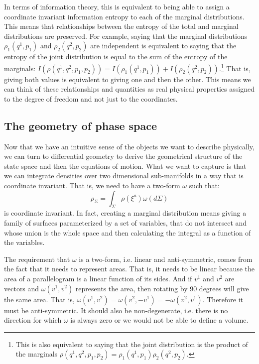 \documentclass[11pt]{article}
\begin{document}
In terms of information theory, this is equivalent to being able to assign a coordinate invariant information entropy to each of the marginal distributions. This means that relationships between the entropy of the total and marginal distributions are preserved. For example, saying that the marginal distributions $\rho_1(q^1, p_1)$ and $\rho_2(q^2, p_2)$ are independent is equivalent to saying that the entropy of the joint distribution is equal to the sum of the entropy of the marginals: $I(\rho(q^1,q^2, p_1, p_2)) = I(\rho_1(q^1, p_1)) +I(\rho_2(q^2, p_2))$.\footnote{This is also equivalent to saying that the joint distribution is the product of the marginals $\rho(q^1,q^2, p_1, p_2) = \rho_1(q^1, p_1)\rho_2(q^2, p_2)$.} That is, giving both values is equivalent to giving one and then the other. This means we can think of these relationships and quantities as real physical properties assigned to the degree of freedom and not just to the coordinates.

\subsection*{The geometry of phase space}

Now that we have an intuitive sense of the objects we want to describe physically, we can turn to differential geometry to derive the geometrical structure of the state space and then the equations of motion. What we want to capture is that we can integrate densities over two dimensional sub-manifolds in a way that is coordinate invariant. That is, we need to have a two-form $\omega$ such that:
\begin{equation}
\rho_\Sigma = \int_\Sigma \rho(\xi^a) \omega(d\Sigma)
\end{equation}
is coordinate invariant. In fact, creating a marginal distribution means giving a family of surfaces parameterized by a set of variables, that do not intersect and whose union is the whole space and then calculating the integral as a function of the variables.

The requirement that $\omega$ is a two-form, i.e. linear and anti-symmetric, comes from the fact that it needs to represent areas. That is, it needs to be linear because the area of a parallelogram is a linear function of its sides. And if $v^1$ and $v^2$ are vectors and $\omega(v^1, v^2)$ represents the area, then rotating by 90 degrees will give the same area. That is, $\omega(v^1, v^2) = \omega(v^2, -v^1) = -\omega(v^2, v^1)$. Therefore it must be anti-symmetric. It should also be non-degenerate, i.e. there is no direction for which $\omega$ is always zero or we would not be able to define a volume.
\end{document}
